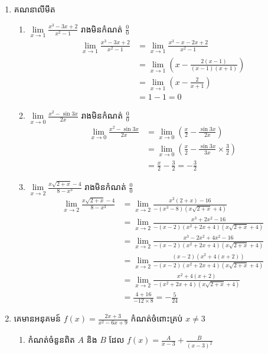 \documentclass[11pt,a4paper]{myclass}
\begin{document}
\begin{enumerate}
		\item គណនាលីមីត
		\begin{enumerate}[k]
			\item $ \lim\limits_{x\to 1}\frac{x^3-3x+2}{x^2-1} $ រាងមិនកំណត់ $ \frac{0}{0} $
			\begin{align*}
			\lim\limits_{x\to 1}\frac{x^3-3x+2}{x^2-1} 
			&=\lim\limits_{x\to 1}\frac{x^3-x-2x+2}{x^2-1}\\
			&=\lim\limits_{x\to 1}\left( x-\frac{2(x-1)}{(x-1)(x+1)} \right)\\
			&=\lim\limits_{x\to 1}\left( x-\frac{2}{x+1} \right)\\
			&=1-1=0
			\end{align*}
			\item $ \lim\limits_{x\to 0}\frac{x^2-\sin 3x}{2x} $ រាងមិនកំណត់ $ \frac{0}{0} $
			\begin{align*}
			\lim\limits_{x\to 0}\frac{x^2-\sin 3x}{2x}
			&=\lim\limits_{x\to 0}\left( \frac{x}{2}-\frac{\sin 3x}{2x} \right)\\
			&=\lim\limits_{x\to 0}\left( \frac{x}{2}-\frac{\sin 3x}{3x}\times\frac{3}{2} \right)\\
			&=\frac{x}{2}-\frac{3}{2}=-\frac{3}{2}
			\end{align*}
			\item $ \lim\limits_{x\to 2}\frac{x\sqrt{2+x}-4}{8-x^3} $ រាងមិនកំណត់ $ \frac{0}{0} $
			\begin{align*}
			\lim\limits_{x\to 2}\frac{x\sqrt{2+x}-4}{8-x^3}
			&=\lim\limits_{x\to 2}\frac{x^2(2+x)-16}{-(x^3-8)(x\sqrt{2+x}+4)}\\
			&=\lim\limits_{x\to 2}\frac{x^3+2x^2-16}{-(x-2)(x^2+2x+4)(x\sqrt{2+x}+4)}\\
			&=\lim\limits_{x\to 2}\frac{x^3-2x^2+4x^2-16}{-(x-2)(x^2+2x+4)(x\sqrt{2+x}+4)}\\
			&=\lim\limits_{x\to 2}\frac{(x-2)(x^2+4(x+2))}{-(x-2)(x^2+2x+4)(x\sqrt{2+x}+4)}\\
			&=\lim\limits_{x\to 2}\frac{x^2+4(x+2)}{-(x^2+2x+4)(x\sqrt{2+x}+4)}\\
			&=\frac{4+16}{-12\times 8}=-\frac{5}{24}
			\end{align*}
		\end{enumerate}
		\item គេមានអនុគមន៍ $ f(x)=\frac{2x+3}{x^2-6x+9} $ កំណត់ចំពោះគ្រប់ $ x\neq 3 $
		\begin{enumerate}
			\item កំណត់ចំនួនពិត $ A $ និង $ B $ ដែល $ f(x)=\frac{A}{x-3}+\frac{B}{(x-3)^2} $
			\begin{align*}

\end{align*}
\end{enumerate}
\end{enumerate}
\end{document}
